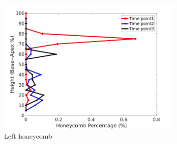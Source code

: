\begin{figure}[H]
\begin{subfigure}{.42\linewidth}
  \includegraphics[width=\linewidth,trim={{.0\wd0} {.0\wd0} {.0\wd0} {.0\wd0}},clip]{Appendix/Image_AppexA/BaseToApex/IPF2LeftLungHoneycombDiseaseAgainstHeight.jpg} %
  \caption{Left honeycomb}
  \label{fig:IPF2DiseaseAgainstHeight-e} 
\end{subfigure} 
\begin{subfigure}{.42\linewidth}%

\end{subfigure}
\end{figure}
